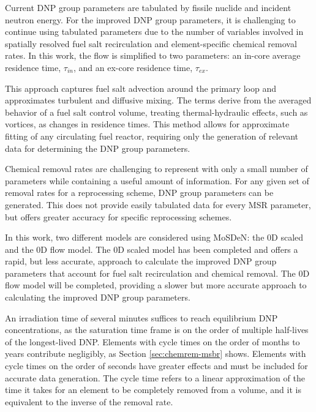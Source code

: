 Current \gls{DNP} group parameters are tabulated by fissile nuclide and incident neutron energy.
For the improved \gls{DNP} group parameters, it is challenging to continue using tabulated parameters due to the number of variables involved in spatially resolved fuel salt recirculation and element-specific chemical removal rates.
In this work, the flow is simplified to two parameters: an in-core average residence time, $\tau_{in}$, and an ex-core residence time, $\tau_{ex}$.

This approach captures fuel salt advection around the primary loop and approximates turbulent and diffusive mixing.
The terms derive from the averaged behavior of a fuel salt control volume, treating thermal-hydraulic effects, such as vortices, as changes in residence times.
This method allows for approximate fitting of any circulating fuel reactor, requiring only the generation of relevant data for determining the \gls{DNP} group parameters.

Chemical removal rates are challenging to represent with only a small number of parameters while containing a useful amount of information.
For any given set of removal rates for a reprocessing scheme, \gls{DNP} group parameters can be generated.
This does not provide easily tabulated data for every \gls{MSR} parameter, but offers greater accuracy for specific reprocessing schemes.

In this work, two different models are considered using \gls{MoSDeN}: the 0D scaled and the 0D flow model.
The 0D scaled model has been completed and offers a rapid, but less accurate, approach to calculate the improved \gls{DNP} group parameters that account for fuel salt recirculation and chemical removal.
The 0D flow model will be completed, providing a slower but more accurate approach to calculating the improved \gls{DNP} group parameters.

An irradiation time of several minutes suffices to reach equilibrium \gls{DNP} concentrations, as the saturation time frame is on the order of multiple half-lives of the longest-lived \gls{DNP}.
Elements with cycle times on the order of months to years contribute negligibly, as Section \ref{sec:chemrem-msbr} shows.
Elements with cycle times on the order of seconds have greater effects and must be included for accurate data generation.
The cycle time refers to a linear approximation of the time it takes for an element to be completely removed from a volume, and it is equivalent to the inverse of the removal rate.

